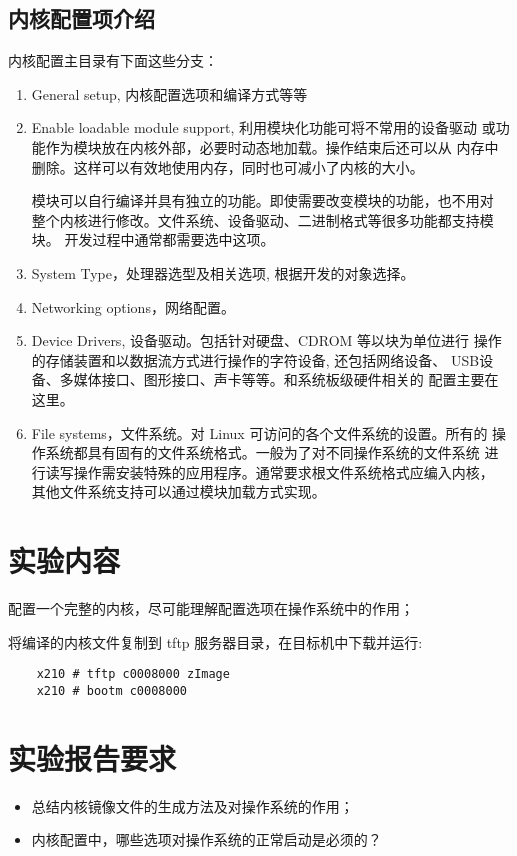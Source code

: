 \subsection{内核配置项介绍}
内核配置主目录有下面这些分支：
\begin{enumerate}
    \item General setup, 内核配置选项和编译方式等等
    \item Enable loadable module support, 利用模块化功能可将不常用的设备驱动
        或功能作为模块放在内核外部，必要时动态地加载。操作结束后还可以从
        内存中删除。这样可以有效地使用内存，同时也可减小了内核的大小。

        模块可以自行编译并具有独立的功能。即使需要改变模块的功能，也不用对
        整个内核进行修改。文件系统、设备驱动、二进制格式等很多功能都支持模块。
        开发过程中通常都需要选中这项。
    \item System Type，处理器选型及相关选项, 根据开发的对象选择。
    \item Networking options，网络配置。
    \item Device Drivers, 设备驱动。包括针对硬盘、CDROM 等以块为单位进行
        操作的存储装置和以数据流方式进行操作的字符设备, 还包括网络设备、
        USB设备、多媒体接口、图形接口、声卡等等。和系统板级硬件相关的
        配置主要在这里。
    \item File systems，文件系统。对 Linux 可访问的各个文件系统的设置。所有的
        操作系统都具有固有的文件系统格式。一般为了对不同操作系统的文件系统
        进行读写操作需安装特殊的应用程序。通常要求根文件系统格式应编入内核，
        其他文件系统支持可以通过模块加载方式实现。
\end{enumerate}

\section{实验内容}
配置一个完整的内核，尽可能理解配置选项在操作系统中的作用；

将编译的内核文件复制到 tftp 服务器目录，在目标机中下载并运行:

\begin{verbatim}
	x210 # tftp c0008000 zImage
	x210 # bootm c0008000
\end{verbatim}


\section{实验报告要求}
\begin{itemize}
  \item 总结内核镜像文件的生成方法及对操作系统的作用；
  \item 内核配置中，哪些选项对操作系统的正常启动是必须的？
\end{itemize}

